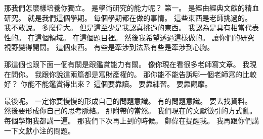 \hypertarget{w01:cue:192}{}那我們怎麼樣培養你獨立。
\hypertarget{w01:cue:193}{}是學術研究的能力呢？
\hypertarget{w01:cue:194}{}第一。
\hypertarget{w01:cue:195}{}是經由經典文獻的精血研究。
\hypertarget{w01:cue:196}{}就是我們這個學期。
\hypertarget{w01:cue:197}{}每個學期都在做的事情。
\hypertarget{w01:cue:198}{}這些東西是老師挑過的。
\hypertarget{w01:cue:199}{}我不敢說。
\hypertarget{w01:cue:200}{}多麼偉大。
\hypertarget{w01:cue:201}{}但是這至少是我認真挑過的東西。
\hypertarget{w01:cue:202}{}我認為是具有相當代表性的。
\hypertarget{w01:cue:203}{}在這個領域。
\hypertarget{w01:cue:204}{}在這個題目裡。
\hypertarget{w01:cue:205}{}然後我希望透過這樣做的。
\hypertarget{w01:cue:206}{}讓你們的研究視野變得開闊。
\hypertarget{w01:cue:207}{}這個東西。
\hypertarget{w01:cue:208}{}有些是牽涉到法系有些是牽涉到心胸。

\hypertarget{w01:cue:209}{}那這個也跟下面一個有關是跟鑑賞能力有關。
\hypertarget{w01:cue:210}{}像你現在看很多老師寫文章。
\hypertarget{w01:cue:211}{}我現在問你。
\hypertarget{w01:cue:212}{}我跟你說這兩篇都是寫財產權的。
\hypertarget{w01:cue:213}{}那你能不能告訴哪一個老師寫的比較好？
\hypertarget{w01:cue:214}{}你能不能鑑賞得出來？
\hypertarget{w01:cue:215}{}這個要靠讀。
\hypertarget{w01:cue:216}{}要靠練習。
\hypertarget{w01:cue:217}{}要靠觀摩。

\hypertarget{w01:cue:218}{}最後呢。
\hypertarget{w01:cue:219}{}一定你要慢慢的形成自己的問題意識。
\hypertarget{w01:cue:220}{}有的問題意識。
\hypertarget{w01:cue:221}{}要去找資料。
\hypertarget{w01:cue:222}{}然後要形成你自己的思考脈絡。
\hypertarget{w01:cue:223}{}那附帶的當然。
\hypertarget{w01:cue:224}{}我們現在的文獻徵引的方式亂。
\hypertarget{w01:cue:225}{}每個學期我都講一遍。
\hypertarget{w01:cue:226}{}那我們下次再上到的時候。
\hypertarget{w01:cue:227}{}鄭偉在提醒我。
\hypertarget{w01:cue:228}{}我再跟你們講一下文獻小注的問題。

